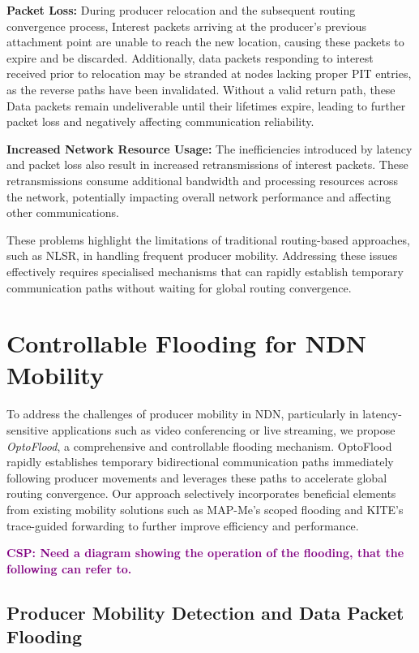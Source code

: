 \documentclass[conference]{IEEEtran}
\newcommand{\csp}[1]{\textbf{\textcolor{purple}{CSP: #1}}}
\begin{document}
\textbf{Packet Loss:} During producer relocation and the subsequent routing convergence process, Interest packets arriving at the producer's previous attachment point are unable to reach the new location, causing these packets to expire and be discarded. Additionally, data packets responding to interest received prior to relocation may be stranded at nodes lacking proper PIT entries, as the reverse paths have been invalidated. Without a valid return path, these Data packets remain undeliverable until their lifetimes expire, leading to further packet loss and negatively affecting communication reliability.

\textbf{Increased Network Resource Usage:} The inefficiencies introduced by latency and packet loss also result in increased retransmissions of interest packets. These retransmissions consume additional bandwidth and processing resources across the network, potentially impacting overall network performance and affecting other communications.

These problems highlight the limitations of traditional routing-based approaches, such as NLSR, in handling frequent producer mobility. Addressing these issues effectively requires specialised mechanisms that can rapidly establish temporary communication paths without waiting for global routing convergence.


\section{Controllable Flooding for NDN Mobility} 
\label{sec:solution}

To address the challenges of producer mobility in NDN, particularly in latency-sensitive applications such as video conferencing or live streaming, we propose \textit{OptoFlood}, a comprehensive and controllable flooding mechanism. OptoFlood rapidly establishes temporary bidirectional communication paths immediately following producer movements and leverages these paths to accelerate global routing convergence. Our approach selectively incorporates beneficial elements from existing mobility solutions such as MAP-Me's scoped flooding and KITE's trace-guided forwarding to further improve efficiency and performance.

\csp{Need a diagram showing the operation of the flooding, that the following can refer to.}

\subsection{Producer Mobility Detection and Data Packet Flooding}
\label{sec:solution:data-flooding}
\end{document}
